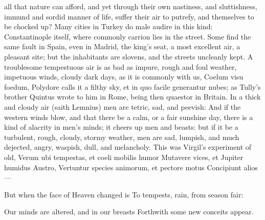 {all that nature can afford, and yet through their own nastiness, and
sluttishness, immund and sordid manner of life, suffer their air to
putrefy, and themselves to be chocked up? Many cities in Turkey do male
audire in this kind: Constantinople itself, where commonly carrion lies
in the street. Some find the same fault in Spain, even in Madrid, the
king's seat, a most excellent air, a pleasant site; but the inhabitants
are slovens, and the streets uncleanly kept.
A troublesome tempestuous air is as bad as impure, rough and foul
weather, impetuous winds, cloudy dark days, as it is commonly with us,
Coelum visu foedum, Polydore calls it a filthy sky, et in quo
facile generantur nubes; as Tully's brother Quintus wrote to him in
Rome, being then quaestor in Britain. In a thick and cloudy air (saith
Lemnius) men are tetric, sad, and peevish: And if the western winds
blow, and that there be a calm, or a fair sunshine day, there is a kind
of alacrity in men's minds; it cheers up men and beasts: but if it be a
turbulent, rough, cloudy, stormy weather, men are sad, lumpish, and
much dejected, angry, waspish, dull, and melancholy. This was
Virgil's experiment of old,
Verum ubi tempestas, et coeli mobilis humor
Mutavere vices, et Jupiter humidus Austro,
Vertuntur species animorum, et pectore motus
Concipiunt alios---


But when the face of Heaven changed is
To tempests, rain, from season fair:

Our minds are altered, and in our breasts
Forthwith some new conceits appear.

}
